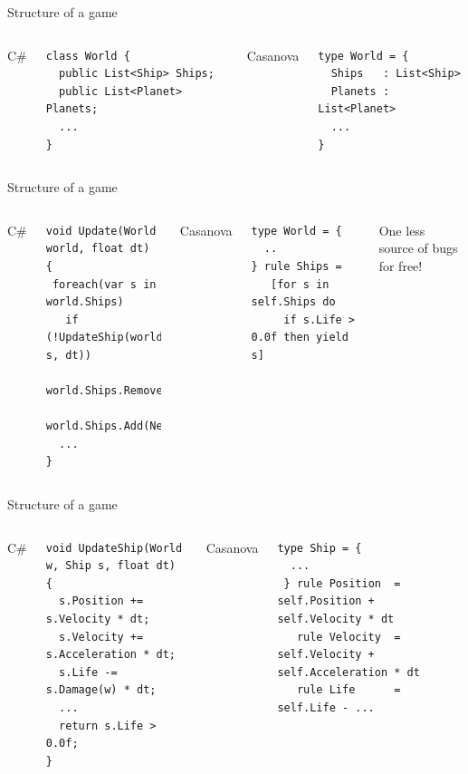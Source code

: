 \documentclass{beamer}
\begin{document}
\begin{frame}[fragile]{Structure of a game}
\begin{columns}
\column{5cm}
\large{C\#}
\begin{lstlisting}
class World {
  public List<Ship> Ships;
  public List<Planet> Planets;
  ...
}
\end{lstlisting}
\column{5cm}
\large{Casanova}
\begin{lstlisting}
type World = {
  Ships   : List<Ship>
  Planets : List<Planet>
  ...
}
\end{lstlisting}
\end{columns}
\end{frame}

\begin{frame}[fragile]{Structure of a game}
\begin{columns}
\column{5cm}
\large{C\#}
\begin{lstlisting}
void Update(World world, float dt) {
 foreach(var s in world.Ships)
   if (!UpdateShip(world, s, dt))
     world.Ships.Remove(s);
 world.Ships.Add(NewShips(world,dt));
  ...
}
\end{lstlisting}
\column{5cm}
\large{Casanova}
\begin{lstlisting}
type World = {
  ..
} rule Ships = 
   [for s in self.Ships do 
     if s.Life > 0.0f then yield s]
\end{lstlisting}
\footnotesize{One less source of bugs for free!}
\end{columns}
\end{frame}

\begin{frame}[fragile]{Structure of a game}
\begin{columns}
\column{5cm}
\large{C\#}
\begin{lstlisting}
void UpdateShip(World w, Ship s, float dt) {
  s.Position += s.Velocity * dt;
  s.Velocity += s.Acceleration * dt;
  s.Life -= s.Damage(w) * dt;
  ...
  return s.Life > 0.0f;
}
\end{lstlisting}
\column{5cm}
\large{Casanova}
\begin{lstlisting}
type Ship = {
  ...
 } rule Position  = self.Position + self.Velocity * dt
   rule Velocity  = self.Velocity + self.Acceleration * dt
   rule Life      = self.Life - ...
\end{lstlisting}
\end{columns}
\end{frame}
\end{document}
